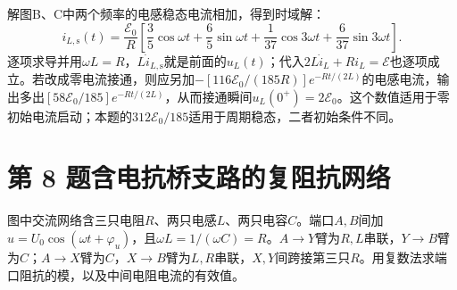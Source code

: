 \documentclass[UTF8,fontset=fandol,a4paper,11pt]{ctexart}
\begin{document}
解图B、C中两个频率的电感稳态电流相加，得到时域解：
\[
i_{L,\mathrm s}(t)=\frac{\mathcal E_0}{R}
\left[\frac35\cos\omega t+\frac65\sin\omega t
+\frac1{37}\cos3\omega t+\frac6{37}\sin3\omega t\right].
\]
逐项求导并用$\omega L=R$，$L\dot i_{L,\mathrm s}$就是前面的$u_L(t)$；代入$2L\dot i_L+Ri_L=\mathcal E$也逐项成立。若改成零电流接通，则应另加$-[116\mathcal E_0/(185R)]e^{-Rt/(2L)}$的电感电流，输出多出$[58\mathcal E_0/185]e^{-Rt/(2L)}$，从而接通瞬间$u_L(0^+)=2\mathcal E_0$。这个数值适用于零初始电流启动；本题的$312\mathcal E_0/185$适用于周期稳态，二者初始条件不同。




\section*{第 8 题\quad 含电抗桥支路的复阻抗网络}\label{q:8}


图中交流网络含三只电阻$R$、两只电感$L$、两只电容$C$。端口$A,B$间加$u=U_0\cos(\omega t+\varphi_u)$，且$\omega L=1/(\omega C)=R$。$A\to Y$臂为$R,L$串联，$Y\to B$臂为$C$；$A\to X$臂为$C$，$X\to B$臂为$L,R$串联，$X,Y$间跨接第三只$R$。用复数法求端口阻抗的模，以及中间电阻电流的有效值。
\end{document}
